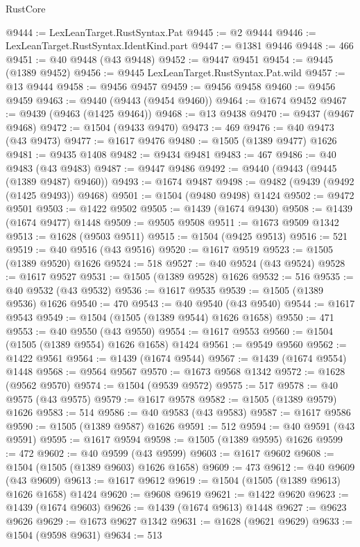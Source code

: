 \begin{lexlean}{RustCore}
\begin{coremodule}
@9444 := LexLeanTarget.RustSyntax.Pat
@9445 := @2 @9444
@9446 := LexLeanTarget.RustSyntax.IdentKind.part
@9447 := @1381 @9446
@9448 := 466
@9451 := @40 @9448 (@43 @9448)
@9452 := @9447 @9451
@9454 := @9445 (@1389 @9452)
@9456 := @9445 LexLeanTarget.RustSyntax.Pat.wild
@9457 := @13 @9444
@9458 := @9456 @9457
@9459 := @9456 @9458
@9460 := @9456 @9459
@9463 := @9440 (@9443 (@9454 @9460))
@9464 := @1674 @9452
@9467 := @9439 (@9463 (@1425 @9464))
@9468 := @13 @9438
@9470 := @9437 (@9467 @9468)
@9472 := @1504 (@9433 @9470)
@9473 := 469
@9476 := @40 @9473 (@43 @9473)
@9477 := @1617 @9476
@9480 := @1505 (@1389 @9477) @1626
@9481 := @9435 @1408
@9482 := @9434 @9481
@9483 := 467
@9486 := @40 @9483 (@43 @9483)
@9487 := @9447 @9486
@9492 := @9440 (@9443 (@9445 (@1389 @9487) @9460))
@9493 := @1674 @9487
@9498 := @9482 (@9439 (@9492 (@1425 @9493)) @9468)
@9501 := @1504 (@9480 @9498) @1424
@9502 := @9472 @9501
@9503 := @1422 @9502
@9505 := @1439 (@1674 @9430)
@9508 := @1439 (@1674 @9477) @1448
@9509 := @9505 @9508
@9511 := @1673 @9509 @1342
@9513 := @1628 (@9503 @9511)
@9515 := @1504 (@9425 @9513)
@9516 := 521
@9519 := @40 @9516 (@43 @9516)
@9520 := @1617 @9519
@9523 := @1505 (@1389 @9520) @1626
@9524 := 518
@9527 := @40 @9524 (@43 @9524)
@9528 := @1617 @9527
@9531 := @1505 (@1389 @9528) @1626
@9532 := 516
@9535 := @40 @9532 (@43 @9532)
@9536 := @1617 @9535
@9539 := @1505 (@1389 @9536) @1626
@9540 := 470
@9543 := @40 @9540 (@43 @9540)
@9544 := @1617 @9543
@9549 := @1504 (@1505 (@1389 @9544) @1626 @1658)
@9550 := 471
@9553 := @40 @9550 (@43 @9550)
@9554 := @1617 @9553
@9560 := @1504 (@1505 (@1389 @9554) @1626 @1658) @1424
@9561 := @9549 @9560
@9562 := @1422 @9561
@9564 := @1439 (@1674 @9544)
@9567 := @1439 (@1674 @9554) @1448
@9568 := @9564 @9567
@9570 := @1673 @9568 @1342
@9572 := @1628 (@9562 @9570)
@9574 := @1504 (@9539 @9572)
@9575 := 517
@9578 := @40 @9575 (@43 @9575)
@9579 := @1617 @9578
@9582 := @1505 (@1389 @9579) @1626
@9583 := 514
@9586 := @40 @9583 (@43 @9583)
@9587 := @1617 @9586
@9590 := @1505 (@1389 @9587) @1626
@9591 := 512
@9594 := @40 @9591 (@43 @9591)
@9595 := @1617 @9594
@9598 := @1505 (@1389 @9595) @1626
@9599 := 472
@9602 := @40 @9599 (@43 @9599)
@9603 := @1617 @9602
@9608 := @1504 (@1505 (@1389 @9603) @1626 @1658)
@9609 := 473
@9612 := @40 @9609 (@43 @9609)
@9613 := @1617 @9612
@9619 := @1504 (@1505 (@1389 @9613) @1626 @1658) @1424
@9620 := @9608 @9619
@9621 := @1422 @9620
@9623 := @1439 (@1674 @9603)
@9626 := @1439 (@1674 @9613) @1448
@9627 := @9623 @9626
@9629 := @1673 @9627 @1342
@9631 := @1628 (@9621 @9629)
@9633 := @1504 (@9598 @9631)
@9634 := 513

\end{coremodule}
\end{lexlean}
